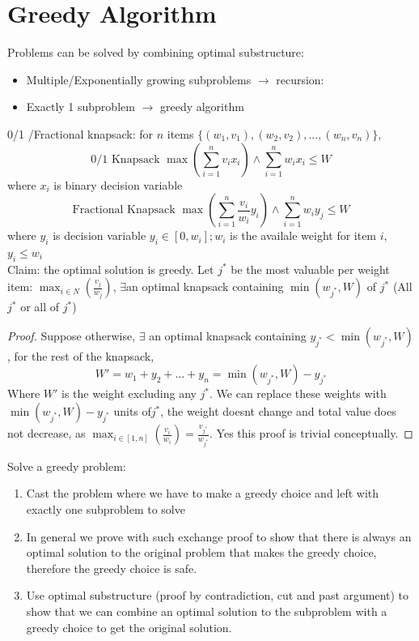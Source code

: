 \documentclass[9pt]{extarticle}
\begin{document}
\section{Greedy Algorithm}
Problems can be solved by combining optimal substructure:
\begin{itemize}
  \item Multiple/Exponentially growing subproblems $\rightarrow$ recursion: 
  \item Exactly 1 subproblem $\rightarrow$ greedy algorithm
\end{itemize}
0/1 /Fractional knapsack: for $n$ items $\{(w_1, v_1), (w_2, v_2), ... , (w_n, v_n)\}$, 
\[\text{0/1 Knapsack } \max(\sum_{i=1}^{n} v_ix_i) \land \sum_{i=1}^{n}w_ix_i \leq W\]
where $x_i$ is binary decision variable
\[\text{Fractional Knapsack } \max(\sum_{i=1}^{n} \frac{v_i}{w_i}y_i) \land \sum_{i=1}^{n} w_i y_j \leq W\]
where $y_i$ is decision variable $y_i \in [0, w_i]; w_i $ is the availale weight for item $i$, $y_i \leq w_i$\\
Claim: the optimal solution is greedy. 
Let $j^*$ be the most valuable per weight item: $\max_{i \in N}(\frac{v_j}{w_j})$, $\exists $an optimal knapsack containing $\min(w_{j^*}, W)$ of $j^*$ (All $j^*$ or all of $j^*$)
\begin{proof}
  Suppose otherwise, $\exists$ an optimal knapsack containing $y_{j^*} < \min(w_{j^*}, W)$, for the rest of the knapsack, 
  \[W' = w_1 + y_2 + \dots + y_n = \min(w_{j^*}, W) - y_{j^*}\]
  Where $W'$ is the weight excluding any $j^*$. We can replace these weights with $\min(w_{j^*}, W) - y_{j^*}$ units of$ j^*$, 
  the weight doesnt change and total value does not decrease, as $\max_{i \in [1, n]}(\frac{v_i}{w_i}) = \frac{v_{j^*}}{w_{j^*}}$. Yes this proof is trivial conceptually. 
\end{proof}
Solve a greedy problem: 
\begin{enumerate}
  \item Cast the problem where we have to make a greedy choice and left with exactly one subproblem to solve 
  \item In general we prove with such exchange proof to show that there is always an optimal solution to the original problem that makes the greedy choice, therefore the greedy 
  choice is safe.
  \item Use optimal substructure (proof by contradiction, cut and past argument) to show that we can combine an optimal solution to the subproblem with a greedy choice to get the original solution.
\end{enumerate}
\end{document}
